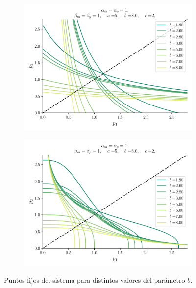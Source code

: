 \documentclass[twocolumn,aps,prl]{revtex4-1}
\begin{document}
\begin{figure}[ht!]
  \centering
  \begin{subfigure}[b]{0.49\linewidth}
    \centering
    \includegraphics[width = 0.999\textwidth]{figuras/ex02-cosa1-3.pdf}
    \caption{}
    \label{fig:figuras/ex02-cosa1-3}
\end{subfigure}\quad
  \begin{subfigure}[b]{0.49\linewidth}
      \centering
      \includegraphics[width = 0.999\textwidth]{figuras/ex02-cosa1-2.pdf}
      \caption{}
      \label{fig:figuras/ex02-cosa1-2}
  \end{subfigure}\quad
  \caption{Puntos fijos del sistema para distintos valores del parámetro $b$.}
  \label{fig:figuras/ex02-puntos fijos}
\end{figure}
\end{document}
